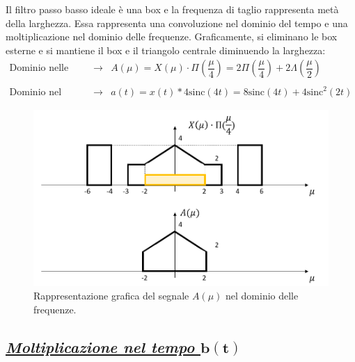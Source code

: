 \documentclass[a4paper]{article}
\begin{document}
	Il filtro passo basso ideale è una box e la frequenza di taglio rappresenta metà della larghezza. Essa rappresenta una convoluzione nel dominio del tempo e una moltiplicazione nel dominio delle frequenze. Graficamente, si eliminano le box esterne e si mantiene il box e il triangolo centrale diminuendo la larghezza:
	\begin{equation*}
		\begin{array}{lll}
			\text{Dominio nelle frequenze} 	& \longrightarrow & A\left(\mu\right) = X\left(\mu\right) \cdot \Pi\left(\dfrac{\mu}{4}\right) = 2\Pi\left(\dfrac{\mu}{4}\right) + 2\Lambda\left(\dfrac{\mu}{2}\right) \\
			\\
			\text{Dominio nel tempo} 		& \longrightarrow & a\left(t\right) = x\left(t\right) * 4\mathrm{sinc}\left(4t\right) = 8\mathrm{sinc}\left(4t\right) + 4\mathrm{sinc}^{2}\left(2t\right)
		\end{array}
	\end{equation*}
	\begin{figure}[!htp]
		\centering
		\includegraphics[width=\textwidth]{img/fig_1.png}
		\caption*{Rappresentazione grafica del segnale $A\left(\mu\right)$ nel dominio delle frequenze.}
	\end{figure}\newpage

	\subsection*{\textcolor{Green4}{\textbf{\emph{\underline{Moltiplicazione nel tempo $\boldsymbol{b\left(t\right)}$}}}}}
	
\end{document}
